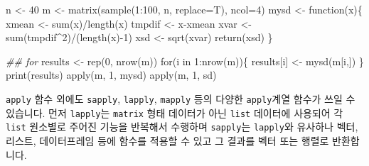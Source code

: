 \documentclass[
  a4paper,
]{book}
\newenvironment{Shaded}{\begin{snugshade}}{\end{snugshade}}
\newcommand{\AttributeTok}[1]{\textcolor[rgb]{0.40,0.45,0.13}{#1}}
\newcommand{\ControlFlowTok}[1]{\textcolor[rgb]{0.00,0.23,0.31}{#1}}
\newcommand{\DecValTok}[1]{\textcolor[rgb]{0.68,0.00,0.00}{#1}}
\newcommand{\DocumentationTok}[1]{\textcolor[rgb]{0.37,0.37,0.37}{\textit{#1}}}
\newcommand{\FunctionTok}[1]{\textcolor[rgb]{0.28,0.35,0.67}{#1}}
\newcommand{\NormalTok}[1]{\textcolor[rgb]{0.00,0.23,0.31}{#1}}
\newcommand{\OtherTok}[1]{\textcolor[rgb]{0.00,0.23,0.31}{#1}}
\newcommand{\SpecialCharTok}[1]{\textcolor[rgb]{0.37,0.37,0.37}{#1}}
\begin{document}
\begin{Shaded}
\begin{Highlighting}[]
\NormalTok{n }\OtherTok{\textless{}{-}} \DecValTok{40}
\NormalTok{m }\OtherTok{\textless{}{-}} \FunctionTok{matrix}\NormalTok{(}\FunctionTok{sample}\NormalTok{(}\DecValTok{1}\SpecialCharTok{:}\DecValTok{100}\NormalTok{, n, }\AttributeTok{replace=}\NormalTok{T), }\AttributeTok{ncol=}\DecValTok{4}\NormalTok{)}
\NormalTok{mysd }\OtherTok{\textless{}{-}} \ControlFlowTok{function}\NormalTok{(x)\{}
\NormalTok{  xmean }\OtherTok{\textless{}{-}} \FunctionTok{sum}\NormalTok{(x)}\SpecialCharTok{/}\FunctionTok{length}\NormalTok{(x)}
\NormalTok{  tmpdif }\OtherTok{\textless{}{-}}\NormalTok{ x}\SpecialCharTok{{-}}\NormalTok{xmean}
\NormalTok{  xvar }\OtherTok{\textless{}{-}} \FunctionTok{sum}\NormalTok{(tmpdif}\SpecialCharTok{\^{}}\DecValTok{2}\NormalTok{)}\SpecialCharTok{/}\NormalTok{(}\FunctionTok{length}\NormalTok{(x)}\SpecialCharTok{{-}}\DecValTok{1}\NormalTok{)}
\NormalTok{  xsd }\OtherTok{\textless{}{-}} \FunctionTok{sqrt}\NormalTok{(xvar)}
  \FunctionTok{return}\NormalTok{(xsd)}
\NormalTok{\}}

\DocumentationTok{\#\# for }
\NormalTok{results }\OtherTok{\textless{}{-}} \FunctionTok{rep}\NormalTok{(}\DecValTok{0}\NormalTok{, }\FunctionTok{nrow}\NormalTok{(m))}
\ControlFlowTok{for}\NormalTok{(i }\ControlFlowTok{in} \DecValTok{1}\SpecialCharTok{:}\FunctionTok{nrow}\NormalTok{(m))\{}
\NormalTok{  results[i] }\OtherTok{\textless{}{-}} \FunctionTok{mysd}\NormalTok{(m[i,])}
\NormalTok{\}}
\FunctionTok{print}\NormalTok{(results)}
\FunctionTok{apply}\NormalTok{(m, }\DecValTok{1}\NormalTok{, mysd)}
\FunctionTok{apply}\NormalTok{(m, }\DecValTok{1}\NormalTok{, sd)}
\end{Highlighting}
\end{Shaded}

\texttt{apply} 함수 외에도 \texttt{sapply}, \texttt{lapply},
\texttt{mapply} 등의 다양한 \texttt{apply}계열 함수가 쓰일 수 있습니다.
먼저 \texttt{lapply}는 \texttt{matrix} 형태 데이터가 아닌 \texttt{list}
데이터에 사용되어 각 \texttt{list} 원소별로 주어진 기능을 반복해서
수행하며 \texttt{sapply}는 \texttt{lapply}와 유사하나 벡터, 리스트,
데이터프레임 등에 함수를 적용할 수 있고 그 결과를 벡터 또는 행렬로
반환합니다.
\end{document}
